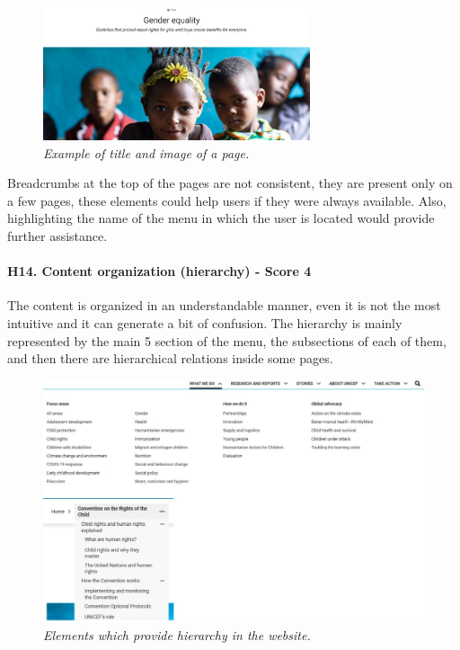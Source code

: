 \begin{figure}[!h]
	\begin{center}
		\includegraphics[width=0.7\textwidth]{FinalScores17.jpg}
		\captionsetup{font=small}
		\caption{\textit{Example of title and image of a page.}}
	\end{center}
\end{figure}
\newline Breadcrumbs at the top of the pages are not consistent, they are present only on a few pages, these elements could help users if they were always available.
\newline Also, highlighting the name of the menu in which the user is located would provide further assistance.
\newline
\newline \paragraph{H14. Content organization (hierarchy) - Score 4}  \label{subsec:H14}	The content is organized in an understandable manner, even it is not the most intuitive and it can generate a bit of confusion.
\newline The hierarchy is mainly represented by the main 5 section of the menu, the subsections of each of them, and then there are hierarchical relations inside some pages.   
\begin{figure}[!h]
	\begin{center}
		\includegraphics[width=\textwidth]{FinalScores18.jpg}
		\captionsetup{font=small}
		\caption{\textit{Elements which provide hierarchy in the website.}}
	\end{center}
\end{figure}
